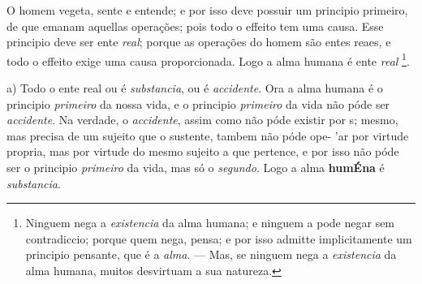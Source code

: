 
 
O homem vegeta, sente e entende; e por isso deve possuir um principio primeiro, de que emanam aquellas operações; pois todo o effeito tem uma causa. Esse principio deve ser ente \emph{real}; porque as operações do homem são entes reaes, e todo o effeito exige uma causa proporcionada. Logo a alma humana é ente \emph{real} \footnote{Ninguem nega a \emph{existencia} da alma humana; e ninguem a pode negar sem contradiccio; porque quem nega, pensa; e por isso admitte implicitamente um principio pensante, que é a \emph{alma}. --- Mas, se ninguem nega a \emph{existencia} da alma humana, muitos desvirtuam a sua natureza.}.



a) Todo o ente real ou é \emph{substancia}, ou é \emph{accidente}. Ora a alma humana é o principio \emph{primeiro} da nossa vida, e o principio \emph{primeiro} da vida não póde ser \emph{accidente}. Na verdade, o \emph{accidente}, assim como não póde existir por s; mesmo, mas precisa de um sujeito que o sustente, tambem não póde ope- 'ar por virtude propria, mas por virtude do mesmo sujeito a que pertence, e por isso não póde ser o principio \emph{primeiro} da vida, mas só o \emph{segundo}. Logo a alma \textbf{humÉna} é \emph{substancia}.

